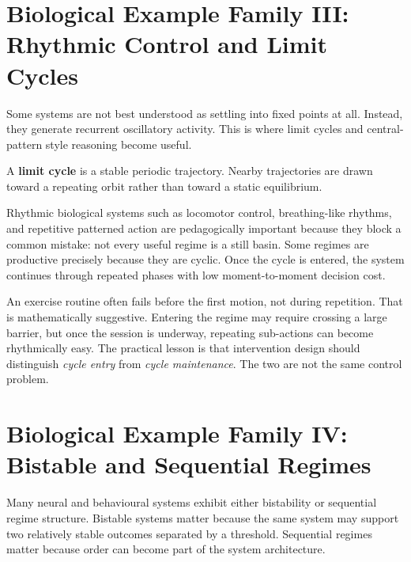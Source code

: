 \section{Biological Example Family III: Rhythmic Control and Limit Cycles}

Some systems are not best understood as settling into fixed points at all.
Instead, they generate recurrent oscillatory activity. This is where limit
cycles and central-pattern style reasoning become useful.

\begin{definition}
A \textbf{limit cycle} is a stable periodic trajectory. Nearby trajectories are
drawn toward a repeating orbit rather than toward a static equilibrium.
\end{definition}

\begin{discussion}
Rhythmic biological systems such as locomotor control, breathing-like rhythms,
and repetitive patterned action are pedagogically important because they block
a common mistake: not every useful regime is a still basin. Some regimes are
productive precisely because they are cyclic. Once the cycle is entered, the
system continues through repeated phases with low moment-to-moment decision
cost.
\end{discussion}

\begin{example}
An exercise routine often fails before the first motion, not during repetition.
That is mathematically suggestive. Entering the regime may require crossing a
large barrier, but once the session is underway, repeating sub-actions can
become rhythmically easy. The practical lesson is that intervention design
should distinguish \emph{cycle entry} from \emph{cycle maintenance}. The two are
not the same control problem.
\end{example}

\section{Biological Example Family IV: Bistable and Sequential Regimes}

Many neural and behavioural systems exhibit either bistability or sequential
regime structure. Bistable systems matter because the same system may support
two relatively stable outcomes separated by a threshold. Sequential regimes
matter because order can become part of the system architecture.

